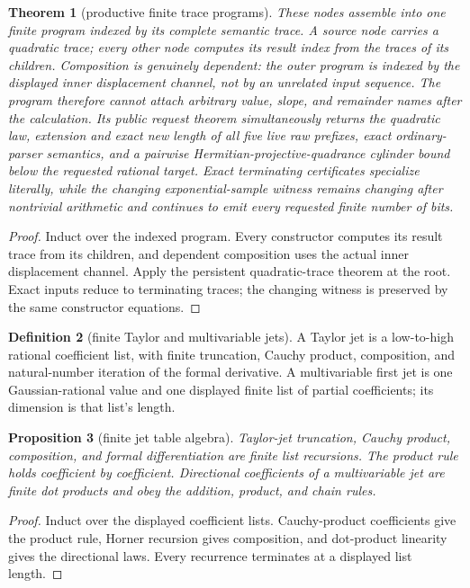 \documentclass[10pt]{article}
\newtheorem{theorem}{Theorem}[section]
\newtheorem{proposition}[theorem]{Proposition}
\theoremstyle{definition}
\newtheorem{definition}[theorem]{Definition}
\theoremstyle{remark}
\begin{document}
\begin{theorem}[productive finite trace programs]
These nodes assemble into one finite program indexed by its complete
semantic trace.  A source node carries a quadratic trace; every
other node computes its result index from the traces of its children.
Composition is genuinely dependent: the outer program is indexed by the
displayed inner displacement channel, not by an unrelated input sequence.
The program therefore cannot attach arbitrary value, slope, and remainder
names after the calculation.  Its public request theorem simultaneously
returns the quadratic law, extension and exact new length of all five live
raw prefixes, exact ordinary-parser semantics, and a pairwise
Hermitian-projective-quadrance cylinder bound below the requested rational
target.  Exact
terminating certificates specialize literally, while the changing
exponential-sample witness remains changing after nontrivial arithmetic and
continues to emit every requested finite number of bits.
\end{theorem}

\begin{proof}
Induct over the indexed program.  Every constructor computes its result trace
from its children, and dependent composition uses the actual inner
displacement channel.  Apply the persistent quadratic-trace theorem at the
root.  Exact inputs reduce to terminating traces; the changing witness is
preserved by the same constructor equations.
\end{proof}

\begin{definition}[finite Taylor and multivariable jets]
A Taylor jet is a
low-to-high rational coefficient list, with finite truncation, Cauchy product,
composition, and natural-number iteration of the formal derivative.  A
multivariable first jet
is one Gaussian-rational value and one displayed finite list of partial
coefficients; its dimension is that list's length.
\end{definition}

\begin{proposition}[finite jet table algebra]
Taylor-jet truncation, Cauchy product, composition, and formal differentiation
are finite list recursions.  The product rule holds coefficient by
coefficient.  Directional coefficients of a multivariable jet are finite dot
products and obey the addition, product, and chain rules.
\end{proposition}

\begin{proof}
Induct over the displayed coefficient lists.  Cauchy-product coefficients
give the product rule, Horner recursion gives composition, and dot-product
linearity gives the directional laws.  Every recurrence terminates at a
displayed list length.
\end{proof}
\end{document}
